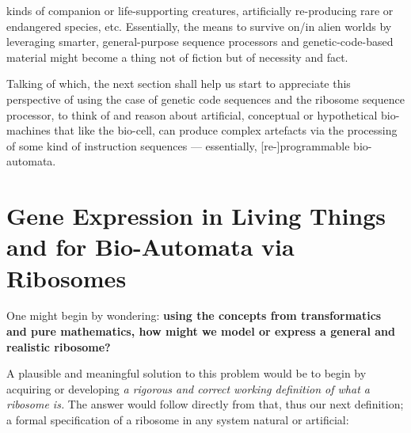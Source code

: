 \documentclass[a4paper, 18pt]{book} %
\begin{document}
kinds of companion or life-supporting creatures, artificially re-producing rare or endangered species, etc. Essentially, the means to survive on/in alien worlds by leveraging smarter, general-purpose sequence processors and genetic-code-based material might become a thing not of fiction but of necessity and fact. 

Talking of which, the next section shall help us start to appreciate this perspective of using the case of genetic code sequences and the ribosome sequence processor, to think of and reason about artificial, conceptual or hypothetical bio-machines that like the bio-cell, can produce complex artefacts via the processing of some kind of instruction sequences --- essentially, [re-]programmable bio-automata.

\section{Gene Expression in Living Things and for Bio-Automata via Ribosomes}
\label{SEC5}

One might begin by wondering: \textbf{using the concepts from transformatics and pure mathematics, how might we model or express a general and realistic ribosome?} 

A plausible and meaningful solution to this problem would be to begin by acquiring or developing \textit{a rigorous and correct working definition of what a ribosome is.} The answer would follow directly from that, thus our next definition; a formal specification of a ribosome in any system natural or artificial:


\end{document}

